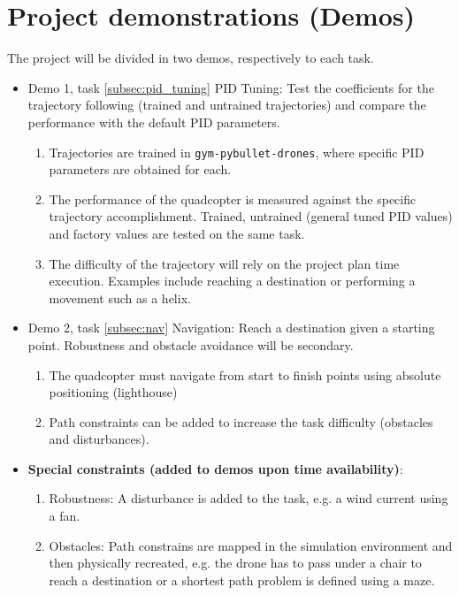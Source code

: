 \documentclass{article}
\begin{document}
\section{Project demonstrations (Demos)}
The project will be divided in two demos, respectively to each task.
\begin{itemize}
    \item Demo 1, task \ref{subsec:pid_tuning} PID Tuning: Test the coefficients for the trajectory following (trained and untrained trajectories) and compare the performance with the default PID parameters. 
    \begin{enumerate}
        \item Trajectories are trained in \verb|gym-pybullet-drones|\cite{pybullet_gym}, where specific PID parameters are obtained for each.
        \item The performance of the quadcopter is measured against the specific trajectory accomplishment. Trained, untrained (general tuned PID values) and factory values are tested on the same task.
        \item The difficulty of the trajectory will rely on the project plan time execution. Examples include reaching a destination or performing a movement such as a helix. 
    \end{enumerate}

    \item Demo 2, task \ref{subsec:nav} Navigation: Reach a destination given a starting point. Robustness and obstacle avoidance will be secondary. 
    \begin{enumerate}
        \item The quadcopter must navigate from start to finish points using absolute positioning (lighthouse)
        \item Path constraints can be added to increase the task difficulty (obstacles and disturbances).
    \end{enumerate}
    \item \textbf{Special constraints (added to demos upon time availability)}:
    \begin{enumerate}
        \item Robustness: A disturbance is added to the task, e.g. a wind current using a fan.
        \item Obstacles: Path constrains are mapped in the simulation environment and then physically recreated, e.g. the drone has to pass under a chair to reach a destination or a shortest path problem is defined using a maze.     
    \end{enumerate}
    
\end{itemize}


\end{document}
